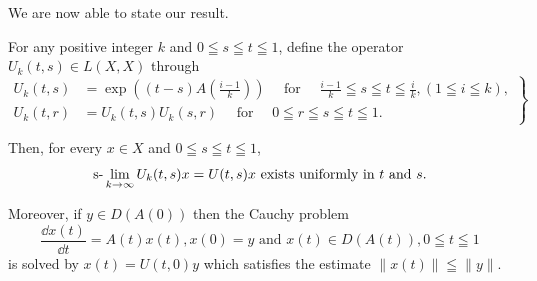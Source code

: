 We are now able to state our result. 

\begin{theorem}\label{thm:XIV.4.Theorem.1} For any positive integer $k$ and $0 \leqq s \leqq t \leqq 1$, define the operator $U_k(t, s) \in L(X, X)$ through 
\begin{equation}\label{eq:XIV.4.1a}
\left.\begin{aligned}
    U _{k} (t, s)& = \exp \left((t - s) A \left(\frac {i - 1}{k}\right)\right) \quad \text{ for } \quad \frac {i - 1}{k} \leqq s \leqq t \leqq \frac {i}{k}, (1 \leqq i \leqq k), \\
    U _{k} (t, r)& = U _{k} (t, s) U _{k} (s, r) \quad \text{ for } \quad 0 \leqq r \leqq s \leqq t \leqq 1. 
\end{aligned}\right\}
\end{equation}

Then, for every $x \in X$ and $0 \leqq s \leqq t \leqq 1$, 
\begin{equation}\label{eq:XIV.4.11}
\text{s-}\lim _{k \to \infty} U _{k} (t, s) x = U (t, s) x \text{ exists uniformly in } t \text{ and } s.
\end{equation}

Moreover, if $y \in D(A(0))$ then the Cauchy problem 
\begin{equation}\tag{1'}\label{eq:XIV.4.1'}
\frac {\dd x (t)}{\dd t} = A (t) x (t), x (0) = y \text{ and } x (t) \in D (A (t)), 0 \leqq t \leqq 1
\end{equation}
is solved by $x(t) = U(t, 0)y$ which satisfies the estimate $\| x(t) \| \leqq \| y \|$.
\end{theorem}

